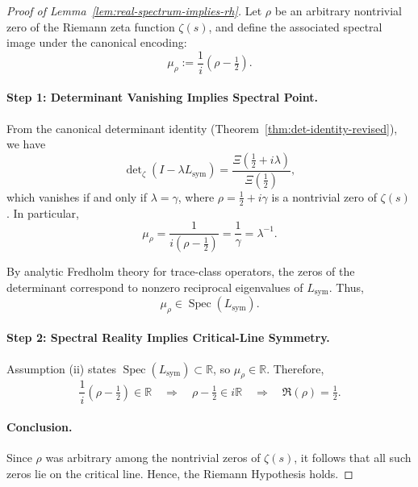 \begin{proof}[Proof of Lemma~\ref{lem:real-spectrum-implies-rh}]
Let \( \rho \) be an arbitrary nontrivial zero of the Riemann zeta function \( \zeta(s) \), and define the associated spectral image under the canonical encoding:
\[
\mu_\rho := \frac{1}{i}(\rho - \tfrac{1}{2}).
\]

\paragraph{Step 1: Determinant Vanishing Implies Spectral Point.}
From the canonical determinant identity (Theorem~\ref{thm:det-identity-revised}), we have
\[
\det\nolimits_{\zeta}(I - \lambda L_{\mathrm{sym}}) = \frac{\Xi\left( \tfrac{1}{2} + i\lambda \right)}{\Xi\left( \tfrac{1}{2} \right)},
\]
which vanishes if and only if \( \lambda = \gamma \), where \( \rho = \tfrac{1}{2} + i\gamma \) is a nontrivial zero of \( \zeta(s) \). In particular,
\[
\mu_\rho = \frac{1}{i(\rho - \tfrac{1}{2})} = \frac{1}{\gamma} = \lambda^{-1}.
\]

By analytic Fredholm theory for trace-class operators, the zeros of the determinant correspond to nonzero reciprocal eigenvalues of \( L_{\mathrm{sym}} \). Thus,
\[
\mu_\rho \in \operatorname{Spec}(L_{\mathrm{sym}}).
\]

\paragraph{Step 2: Spectral Reality Implies Critical-Line Symmetry.}
Assumption (ii) states \( \operatorname{Spec}(L_{\mathrm{sym}}) \subset \mathbb{R} \), so \( \mu_\rho \in \mathbb{R} \). Therefore,
\[
\frac{1}{i}(\rho - \tfrac{1}{2}) \in \mathbb{R}
\quad \Rightarrow \quad \rho - \tfrac{1}{2} \in i\mathbb{R}
\quad \Rightarrow \quad \Re(\rho) = \tfrac{1}{2}.
\]

\paragraph{Conclusion.}
Since \( \rho \) was arbitrary among the nontrivial zeros of \( \zeta(s) \), it follows that all such zeros lie on the critical line. Hence, the Riemann Hypothesis holds.
\end{proof}
